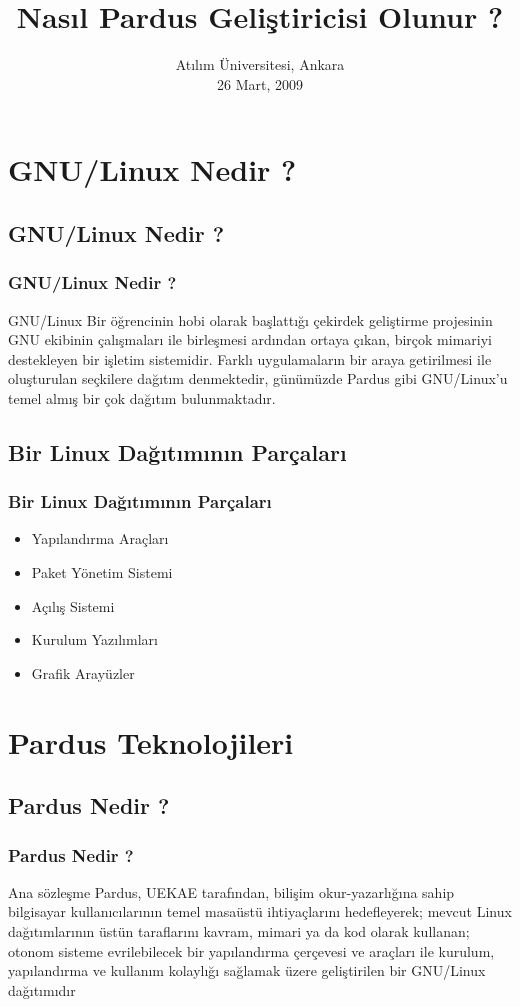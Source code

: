 \documentclass{beamer}
\title{Nasıl Pardus Geliştiricisi Olunur ?}
\author[Gökmen Göksel \& Gökçen Eraslan]{}
\date{Atılım Üniversitesi, Ankara\\ 26 Mart, 2009}
\institute{
  Ulusal Elektronik ve Kriptoloji Araştırma Enstitüsü\\
  TÜBİTAK}
\begin{document}
\frame{\titlepage}

\section{GNU/Linux Nedir ?}

\subsection{GNU/Linux Nedir ?}
\frame
{
    \frametitle{GNU/Linux Nedir ?}
    \begin{block}{GNU/Linux}
        Bir öğrencinin hobi olarak başlattığı çekirdek geliştirme projesinin GNU ekibinin çalışmaları ile birleşmesi ardından ortaya çıkan, birçok mimariyi destekleyen bir işletim sistemidir. Farklı uygulamaların bir araya getirilmesi ile oluşturulan seçkilere dağıtım denmektedir, günümüzde Pardus gibi GNU/Linux'u temel almış bir çok dağıtım bulunmaktadır.
    \end{block}
}

\subsection{Bir Linux Dağıtımının Parçaları}
\frame
{
    \frametitle{Bir Linux Dağıtımının Parçaları}
    \begin{itemize}
       \item Yapılandırma Araçları
       \item Paket Yönetim Sistemi
       \item Açılış Sistemi
       \item Kurulum Yazılımları
       \item Grafik Arayüzler
    \end{itemize}
}

\section{Pardus Teknolojileri}

\subsection{Pardus Nedir ?}
\frame
{
    \frametitle{Pardus Nedir ?}
    \begin{block}{Ana sözleşme}
        Pardus, UEKAE tarafından, bilişim okur-yazarlığına sahip bilgisayar kullanıcılarının temel masaüstü ihtiyaçlarını hedefleyerek; mevcut Linux dağıtımlarının üstün taraflarını kavram, mimari ya da kod olarak kullanan; otonom sisteme evrilebilecek bir yapılandırma çerçevesi ve araçları ile kurulum, yapılandırma ve kullanım kolaylığı sağlamak üzere geliştirilen bir GNU/Linux dağıtımıdır
    \end{block}
}
\end{document}
